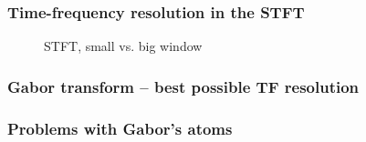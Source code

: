 \documentclass{beamer}
\begin{document}
\begin{frame}
	\frametitle{Time-frequency resolution in the STFT}
	\begin{figure}
		\centering
		\caption{STFT, small vs. big window}
	\end{figure}
\end{frame}

\begin{frame}
	\frametitle{Gabor transform -- best possible TF resolution}
\end{frame}

\begin{frame}
	\frametitle{Problems with Gabor's atoms}
\end{frame}
\end{document}
